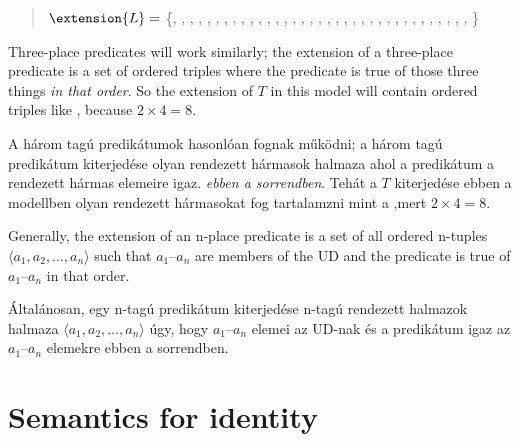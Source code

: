 
\begin{quote}
$\extension{L}=$ \{, , , , , , , ,
, , , , , , ,
, , , , , ,
, , , , ,
, , , ,
, , ,
, ,
%
\}
\end{quote}

Three-place predicates will work similarly; the extension of a three-place predicate is a set of ordered triples where the predicate is true of those three things \emph{in that order}. So the extension of $T$ in this model will contain ordered triples like , because $2\times 4 = 8$.

A három tagú predikátumok hasonlóan fognak működni; a három tagú predikátum kiterjedése olyan rendezett hármasok halmaza ahol a predikátum a rendezett hármas elemeire igaz. \emph{ebben a sorrendben}. Tehát a $T$ kiterjedése ebben a modellben olyan rendezett hármasokat fog tartalamzni mint a ,mert $2\times 4 = 8$.

Generally, the extension of an n-place predicate is a set of all ordered n-tuples ${\langle}a_1, a_2,\ldots, a_n{\rangle}$ such that $a_1$--$a_n$ are members of the UD and the predicate is true of $a_1$--$a_n$ in that order.

Általánosan, egy n-tagú predikátum kiterjedése  n-tagú rendezett halmazok halmaza ${\langle}a_1, a_2,\ldots, a_n{\rangle}$ úgy, hogy $a_1$--$a_n$ elemei az UD-nak és a predikátum igaz az  $a_1$--$a_n$ elemekre ebben a sorrendben.





\section*{Semantics for identity}
